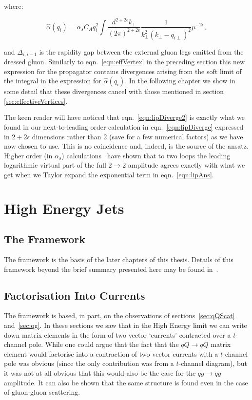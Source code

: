 	where:

	\begin{equation}
		\hat{\alpha}(q_i) = \alpha_sC_Aq_i^2\int \frac{d^{2+2\epsilon}k_{\perp}}{(2\pi)^{2+2\epsilon}}
		\frac{1}{k^2_\perp(k_\perp - q_{i\perp})^2}\mu^{-2\epsilon},
		\label{eqn:lipDiverge2}
	\end{equation}

	and $\Delta_{i,i-1}$ is the rapidity gap between the external gluon legs emitted from
	the dressed gluon.  Similarly to eqn.~\eqref{eqn:effVertex} in the preceding section this
	new expression for the propagator contains divergences arising from the soft limit
	of the integral in the expression for $\hat{\alpha}(q_i)$.  In the following chapter we
	show in some detail that these divergences cancel with those mentioned in section
	\ref{sec:effectiveVertices}.

	The keen reader will have noticed that eqn.~\eqref{eqn:lipDiverge2} is exactly what we
	found in our next-to-leading order calculation in eqn.~\eqref{eqn:lipDiverge} expressed
	in $2+2\epsilon$ dimensions rather than 2 (save for a few numerical factors) as we have
	now chosen to use.  This is no coincidence and, indeed, is the source of the ansatz.  Higher
	order (in $\alpha_s$) calculations~\cite{DelDuca:1995hf,9780511524387} have shown that to
	two loops the leading logarithmic virtual part of the full $2\to2$ amplitude agrees exactly with what
	we get when we Taylor expand the exponential term in eqn.~\eqref{eqn:lipAns}.

\section{High Energy Jets}
	\label{sec:HEJ}

	\subsection{The \hej Framework}

	The \hej framework is the basis of the later chapters of this thesis.  Details of this framework
	beyond the brief summary presented here may be found in~\cite{ZPaper,Andersen:2009nu,Andersen:2009he,
	Andersen:2011hs,Andersen:2012gk}.

	\subsection{Factorisation Into Currents}
	\label{sec:currents}

		The \hej framework is based, in part, on the observations of sections~\eqref{sec:qQScat}
		and~\eqref{sec:qg}.  In these sections we saw that in the High Energy limit we can write down
		matrix elements in the form of two vector `currents' contracted over a $t$-channel pole.  While
		one could argue that the fact that the $qQ\to qQ$ matrix element would factorise into a contraction
		of two vector currents with a $t$-channel pole was obvious (since the only contribution was
		from a $t$-channel diagram), but it was not at all obvious that this would also be the case for the
		$qg\to qg$ amplitude.  It can also be shown that the same structure is found even in the case of
		gluon-gluon scattering\cite{Andersen:2011hs}.

